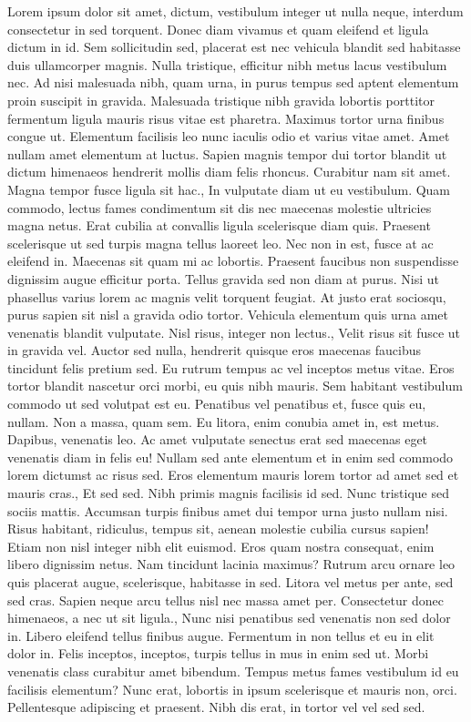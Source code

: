 \documentclass{source/tex/templates/maththesis}
\begin{document}
Lorem ipsum dolor sit amet, dictum, vestibulum integer ut nulla neque, interdum consectetur in sed torquent. Donec diam vivamus et quam eleifend et ligula dictum in id. Sem sollicitudin sed, placerat est nec vehicula blandit sed habitasse duis ullamcorper magnis. Nulla tristique, efficitur nibh metus lacus vestibulum nec. Ad nisi malesuada nibh, quam urna, in purus tempus sed aptent elementum proin suscipit in gravida. Malesuada tristique nibh gravida lobortis porttitor fermentum ligula mauris risus vitae est pharetra. Maximus tortor urna finibus congue ut. Elementum facilisis leo nunc iaculis odio et varius vitae amet. Amet nullam amet elementum at luctus. Sapien magnis tempor dui tortor blandit ut dictum himenaeos hendrerit mollis diam felis rhoncus. Curabitur nam sit amet. Magna tempor fusce ligula sit hac., In vulputate diam ut eu vestibulum. Quam commodo, lectus fames condimentum sit dis nec maecenas molestie ultricies magna netus. Erat cubilia at convallis ligula scelerisque diam quis. Praesent scelerisque ut sed turpis magna tellus laoreet leo. Nec non in est, fusce at ac eleifend in. Maecenas sit quam mi ac lobortis. Praesent faucibus non suspendisse dignissim augue efficitur porta. Tellus gravida sed non diam at purus. Nisi ut phasellus varius lorem ac magnis velit torquent feugiat. At justo erat sociosqu, purus sapien sit nisl a gravida odio tortor. Vehicula elementum quis urna amet venenatis blandit vulputate. Nisl risus, integer non lectus., Velit risus sit fusce ut in gravida vel. Auctor sed nulla, hendrerit quisque eros maecenas faucibus tincidunt felis pretium sed. Eu rutrum tempus ac vel inceptos metus vitae. Eros tortor blandit nascetur orci morbi, eu quis nibh mauris. Sem habitant vestibulum commodo ut sed volutpat est eu. Penatibus vel penatibus et, fusce quis eu, nullam. Non a massa, quam sem. Eu litora, enim conubia amet in, est metus. Dapibus, venenatis leo. Ac amet vulputate senectus erat sed maecenas eget venenatis diam in felis eu! Nullam sed ante elementum et in enim sed commodo lorem dictumst ac risus sed. Eros elementum mauris lorem tortor ad amet sed et mauris cras., Et sed sed. Nibh primis magnis facilisis id sed. Nunc tristique sed sociis mattis. Accumsan turpis finibus amet dui tempor urna justo nullam nisi. Risus habitant, ridiculus, tempus sit, aenean molestie cubilia cursus sapien! Etiam non nisl integer nibh elit euismod. Eros quam nostra consequat, enim libero dignissim netus. Nam tincidunt lacinia maximus? Rutrum arcu ornare leo quis placerat augue, scelerisque, habitasse in sed. Litora vel metus per ante, sed sed cras. Sapien neque arcu tellus nisl nec massa amet per. Consectetur donec himenaeos, a nec ut sit ligula., Nunc nisi penatibus sed venenatis non sed dolor in. Libero eleifend tellus finibus augue. Fermentum in non tellus et eu in elit dolor in. Felis inceptos, inceptos, turpis tellus in mus in enim sed ut. Morbi venenatis class curabitur amet bibendum. Tempus metus fames vestibulum id eu facilisis elementum? Nunc erat, lobortis in ipsum scelerisque et mauris non, orci. Pellentesque adipiscing et praesent. Nibh dis erat, in tortor vel vel sed sed.
\end{document}
